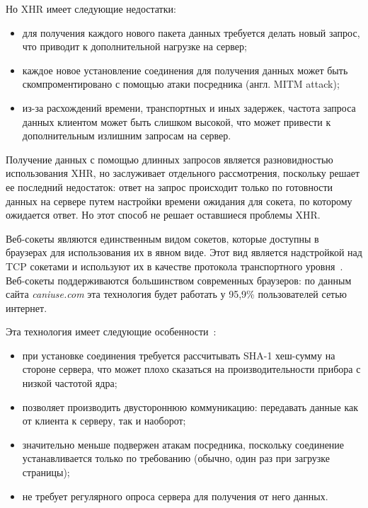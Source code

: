 Но XHR имеет следующие недостатки:
\begin{itemize}
    \item для получения каждого нового пакета данных требуется делать новый запрос,
        что приводит к дополнительной нагрузке на сервер;
    \item каждое новое установление соединения для получения данных может быть
        скомпроментировано с помощью атаки посредника (англ. MITM attack);
    \item из-за расхождений времени, транспортных и иных задержек, частота
        запроса данных клиентом может быть слишком высокой,
        что может привести к дополнительным излишним запросам на сервер.
\end{itemize}


Получение данных с помощью длинных запросов является разновидностью использования
XHR, но заслуживает отдельного рассмотрения, поскольку решает ее последний недостаток:
ответ на запрос происходит только по готовности данных на сервере путем настройки
времени ожидания для сокета, по которому ожидается ответ. Но этот способ не решает
оставшиеся проблемы XHR.

Веб-сокеты являются единственным видом сокетов, которые доступны в браузерах
для использования их в явном виде. Этот вид является надстройкой над TCP сокетами
и используют их в качестве протокола транспортного уровня~\cite{websock_rfc}.
Веб-сокеты поддерживаются большинством современных браузеров: по данным сайта
\textit{caniuse.com} эта технология будет работать у 95,9\% пользователей
сетью интернет.

Эта технология имеет следующие особенности~\cite{websock_rfc}:
\begin{itemize}
    \item при установке соединения требуется рассчитывать SHA-1 хеш-сум\-му на стороне
        сервера, что может плохо сказаться на производительности прибора с низкой
        частотой ядра;
    \item позволяет производить двустороннюю коммуникацию: передавать данные как
        от клиента к серверу, так и наоборот;
    \item значительно меньше подвержен атакам посредника, поскольку соединение
        устанавливается только по требованию (обычно, один раз при загрузке страницы);
    \item не требует регулярного опроса сервера для получения от него данных.
\end{itemize}

